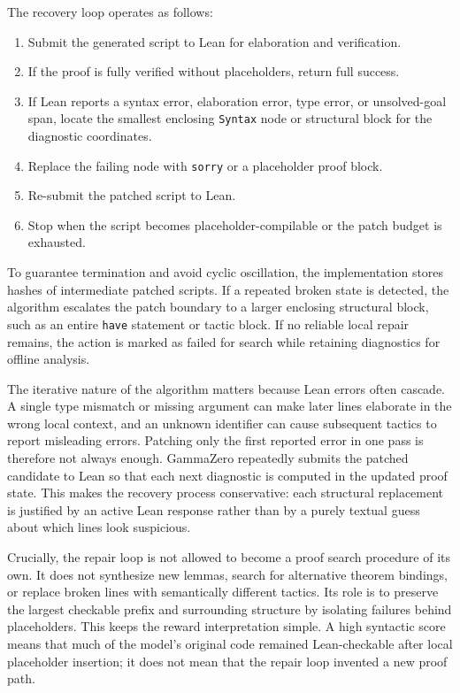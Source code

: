 \documentclass[en]{uet_awesome_thesis/uet-awesome-thesis}
\begin{document}
The recovery loop operates as follows:
\begin{enumerate}
    \item Submit the generated script to Lean for elaboration and verification.
    \item If the proof is fully verified without placeholders, return full success.
    \item If Lean reports a syntax error, elaboration error, type error, or unsolved-goal span, locate the smallest enclosing \texttt{Syntax} node or structural block for the diagnostic coordinates.
    \item Replace the failing node with \texttt{sorry} or a placeholder proof block.
    \item Re-submit the patched script to Lean.
    \item Stop when the script becomes placeholder-compilable or the patch budget is exhausted.
\end{enumerate}

To guarantee termination and avoid cyclic oscillation, the implementation stores hashes of intermediate patched scripts. If a repeated broken state is detected, the algorithm escalates the patch boundary to a larger enclosing structural block, such as an entire \texttt{have} statement or tactic block. If no reliable local repair remains, the action is marked as failed for search while retaining diagnostics for offline analysis.

The iterative nature of the algorithm matters because Lean errors often cascade. A single type mismatch
or missing argument can make later lines elaborate in the wrong local context, and an unknown identifier
can cause subsequent tactics to report misleading errors. Patching only the first reported error in one
pass is therefore not always enough. GammaZero repeatedly submits the patched candidate to Lean so
that each next diagnostic is computed in the updated proof state. This makes the recovery process
conservative: each structural replacement is justified by an active Lean response rather than by a purely
textual guess about which lines look suspicious.

Crucially, the repair loop is not allowed to become a proof search procedure of its own. It does not
synthesize new lemmas, search for alternative theorem bindings, or replace broken lines with
semantically different tactics. Its role is to preserve the largest checkable prefix and surrounding
structure by isolating failures behind placeholders. This keeps the reward interpretation simple. A high
syntactic score means that much of the model's original code remained Lean-checkable after local
placeholder insertion; it does not mean that the repair loop invented a new proof path.
\end{document}
